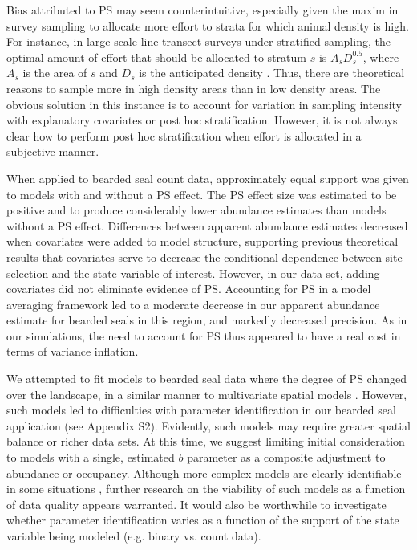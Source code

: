 \documentclass[times,mee,doublespace,]{besauth2}
\begin{document}
Bias attributed to PS may seem counterintuitive, especially given the maxim in survey sampling to allocate more effort to strata for which animal density is high. For instance, in large scale line transect surveys under stratified sampling, the optimal amount of effort that should be allocated to stratum $s$ is $A_s D_s^{0.5}$, where $A_s$ is the area of $s$ and $D_s$ is the anticipated density \citep[][eqn 7.7]{BucklandEtAl2001}.  Thus, there are theoretical reasons to sample more in high density areas than in low density areas. The obvious solution in this instance is to account for variation in sampling intensity with explanatory covariates or post hoc stratification. However, it is not always clear how to perform post hoc stratification when effort is allocated in a subjective manner.

When applied to bearded seal count data, approximately equal support was given to models with and without a PS effect.  The PS effect size was estimated to be positive and to produce considerably lower abundance estimates than models without a PS effect.  Differences between apparent abundance estimates decreased when covariates were added to model structure, supporting previous theoretical results \citep{DiggleEtAl2010,PatiEtAl2011} that covariates serve to decrease the conditional dependence between site selection and the state variable of interest.  However, in our data set, adding covariates did not eliminate evidence of PS. Accounting for PS in a model averaging framework led to a moderate decrease in our apparent abundance estimate for bearded seals in this region, and markedly decreased precision.  As in our simulations, the need to account for PS thus appeared to have a real cost in terms of variance inflation.

We attempted to fit models to bearded seal data where the degree of PS changed over the landscape, in a similar manner to multivariate spatial models \citep{RoyleBerliner1999}. However, such models led to difficulties with parameter identification in our bearded seal application (see Appendix S2).  Evidently, such models may require greater spatial balance or richer data sets.  At this time, we suggest limiting initial consideration to models with a single, estimated $b$ parameter as a composite adjustment to abundance or occupancy.  Although more complex models are clearly identifiable in some situations \citep{RoyleBerliner1999}, further research on the viability of such models as a function of data quality appears warranted.  It would also be worthwhile to investigate whether parameter identification varies as a function of the support of the state variable being modeled (e.g. binary vs. count data).
\end{document}
